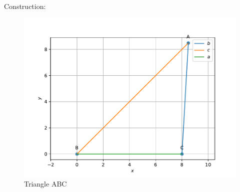 \documentclass{article}
\begin{document}
Construction: \\
\begin{figure}[h]
 \begin{center}
	 \includegraphics[width=\columnwidth]{figs/triangle.pdf}
 \end{center}
 \caption{Triangle ABC}
 \label{fig:Fig1}
\end{figure}
\end{document}
